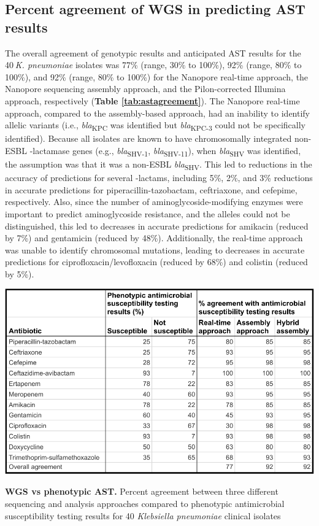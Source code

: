 \subsection{Percent agreement of WGS in predicting AST results}
\label{sec:agree}

The overall agreement of genotypic results and anticipated AST results for the 40 \textit{K. pneumoniae} isolates was 77\% (range, 30\% to 100\%), 92\% (range, 80\% to 100\%), and 92\% (range, 80\% to 100\%) for the Nanopore real-time approach, the Nanopore sequencing assembly approach, and the Pilon-corrected Illumina approach, respectively ({\bf Table \ref{tab:astagreement}}). The Nanopore real-time approach, compared to the assembly-based approach, had an inability to identify allelic variants (i.e., \textit{bla}\textsubscript{KPC} was identified but \textit{bla}\textsubscript{KPC-3} could not be specifically identified). Because all  isolates are known to have chromosomally integrated non-ESBL {\textbeta}-lactamase genes (e.g., \textit{bla}\textsubscript{SHV-1}, \textit{bla}\textsubscript{SHV-11}), when \textit{bla}\textsubscript{SHV} was identified, the assumption was that it was a non-ESBL \textit{bla}\textsubscript{SHV}. This led to reductions in the accuracy of predictions for several {\textbeta}-lactams, including 5\%, 2\%, and 3\% reductions in accurate predictions for piperacillin-tazobactam, ceftriaxone, and cefepime, respectively. Also, since the number of aminoglycoside-modifying enzymes were important to predict aminoglycoside resistance, and the alleles could not be distinguished, this led to decreases in accurate predictions for amikacin (reduced by 7\%) and gentamicin (reduced by 48\%). Additionally, the real-time approach was unable to identify chromosomal mutations, leading to decreases in accurate predictions for ciprofloxacin/levofloxacin (reduced by 68\%) and colistin (reduced by 5\%).

\begin{table}[!ht]
\centering
\includegraphics[width = 1\linewidth,keepaspectratio]{figure/astagreement.pdf}
\caption[WGS vs phenotypic AST]{{\bf WGS vs phenotypic AST.} Percent agreement between three different sequencing and analysis approaches compared to phenotypic antimicrobial susceptibility testing results for 40 \textit{Klebsiella pneumoniae} clinical isolates }
\label{tab:astagreement}
\end{table}


